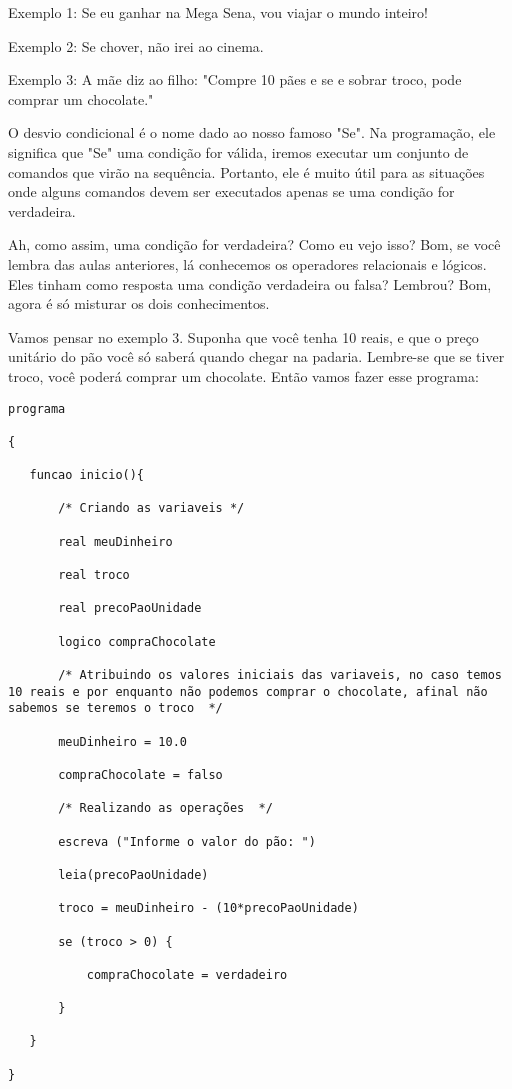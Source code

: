 \documentclass{article}
\begin{document}
Exemplo 1: Se eu ganhar na Mega Sena, vou viajar o mundo inteiro!

Exemplo 2: Se chover, não irei ao cinema.

Exemplo 3: A mãe diz ao filho: "Compre 10 pães e se e sobrar troco, pode comprar um chocolate."

O desvio condicional é o nome dado ao nosso famoso "Se". Na programação, ele significa que "Se" uma condição for válida, iremos executar um conjunto de comandos que virão na sequência. Portanto, ele é muito útil para as situações onde alguns comandos devem ser executados apenas se uma condição for verdadeira.

Ah, como assim, uma condição for verdadeira? Como eu vejo isso? Bom, se você lembra das aulas anteriores, lá conhecemos os operadores relacionais e lógicos. Eles tinham como resposta uma condição verdadeira ou falsa? Lembrou? Bom, agora é só misturar os dois conhecimentos.

Vamos pensar no exemplo 3. Suponha que você tenha 10 reais, e que o preço unitário do pão você só saberá quando chegar na padaria. Lembre-se que se tiver troco, você poderá comprar um chocolate. Então vamos fazer esse programa:

\begin{lstlisting}
programa

{

   funcao inicio(){

       /* Criando as variaveis */

       real meuDinheiro

       real troco

       real precoPaoUnidade

       logico compraChocolate

       /* Atribuindo os valores iniciais das variaveis, no caso temos 10 reais e por enquanto não podemos comprar o chocolate, afinal não sabemos se teremos o troco  */

       meuDinheiro = 10.0

       compraChocolate = falso

       /* Realizando as operações  */

       escreva ("Informe o valor do pão: ")

       leia(precoPaoUnidade)

       troco = meuDinheiro - (10*precoPaoUnidade)

       se (troco > 0) {

           compraChocolate = verdadeiro

       }

   }

}
\end{lstlisting}
\end{document}
